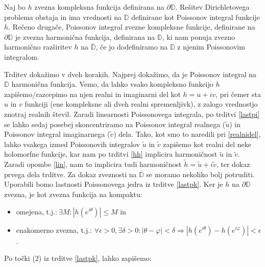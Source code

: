 \documentclass[mat1]{fmfdelo}
\begin{document}
     \begin{trditev}
        \label{obstoj}
        Naj bo $h$ zvezna kompleksna funkcija definirana na $\partial \mathbb{D}$. Rešitev Dirichletovega problema obstaja in ima vrednosti na $\mathbb{D}$ definirane kot Poissonov integral funkcije $h$.
        \newline
        Rečeno drugače, Poissonov integral zvezne kompleksne funkcije, definirane na $\partial \mathbb{D}$ je zvezna harmonična funkcija, definirana na $\mathbb{D}$, ki nam ponuja zvezno harmonično razširitev $h$ na $\overline{\mathbb{D}}$, če jo dodefiniramo na $\mathbb{D}$ z njenim Poissonovim integralom.
     \end{trditev}
     \begin{dokaz}
        Trditev dokažimo v dveh korakih. Najprej dokažimo, da je Poissonov integral na $\mathbb{D}$ harmonična funkcija.
        Vemo, da lahko vsako kompleksno funkcijo $h$ zapišemo/razcepimo na njen realni in imaginarni del kot $h = u + iv$, pri čemer sta $u$ in $v$ funkciji (ene kompleksne ali dveh realni spremenljivk), z zalogo vrednostjo znotraj realnih števil. 
        Zaradi linearnosti Poissonovega integrala, po trditvi \ref{lastpi} se lahko sedaj posebej skoncentriramo na Poissonov integral realnega ($\widetilde{u}$) in Poissonov integral imaginarnega ($\widetilde{v}$) dela. 
        Tako, kot smo to naredili pri \ref{realnidel}, lahko vsakega izmed Poissonovih integralov $\widetilde{u}$ in $\widetilde{v}$ zapišemo kot realni del neke holomorfne funkcije, kar nam po trditvi \ref{hh} implicira harmoničnost $\widetilde{u}$ in $\widetilde{v}$.
        Zaradi opombe \ref{lin}, nam to implicira tudi harmoničnost $\widetilde{h} = \widetilde{u} + i\widetilde{v}$, ter dokaz prvega dela trditve. 
        \newline
        Za dokaz zveznosti na $\overline{\mathbb{D}}$ se moramo nekoliko bolj potruditi. Uporabili bomo lastnosti Poissonovega jedra iz trditve \ref{lastpk}. 
        Ker je $h$ na $\partial \mathbb{D}$ zvezna, je kot zvezna funkcija na kompaktu: 
        \begin{itemize}
            \item omejena, t.j.:$~\exists M: |h(e^{i\theta})| \leq M$ in 
            \item enakomerno zvezna, t.j.: $\forall \epsilon > 0, \exists \delta > 0: | \theta - \varphi | < \delta \Rightarrow |h(e^{i\theta}) - h(e^{i\varphi})| < \epsilon $.
        \end{itemize}
        Po točki (2) iz trditve \ref{lastpk}, lahko zapišemo:

\end{dokaz}
\end{document}
